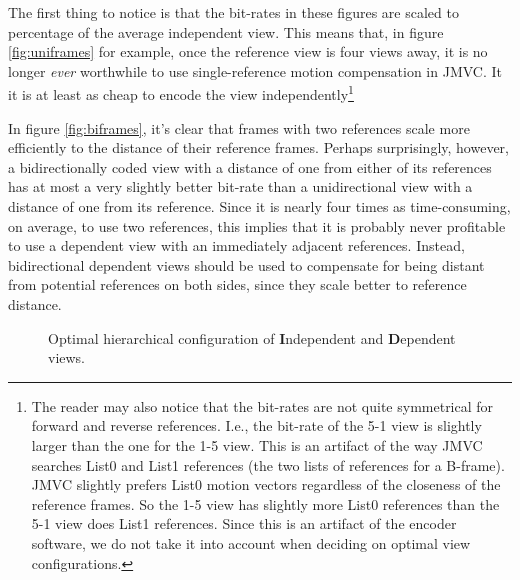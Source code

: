 \documentclass{sig-alternate-05-2015}
\begin{document}
The first thing to notice is that the bit-rates in these figures are scaled to
percentage of the average independent view. This means that, in figure
\ref{fig:uniframes} for example, once the reference view is four views away,
it is no longer {\it ever} worthwhile to use single-reference motion
compensation in JMVC. It it is at least as cheap to encode the view
independently\footnote{The reader may also notice that the bit-rates are not
quite symmetrical for forward and reverse references. I.e., the bit-rate of
the 5-1 view is slightly larger than the one for the 1-5 view. This is an
artifact of the way JMVC searches List0 and List1 references (the two lists
of references for a B-frame). JMVC slightly prefers List0 motion vectors
regardless of the closeness of the reference frames. So the 1-5 view has
slightly more List0 references than the 5-1 view does List1 references. Since
this is an artifact of the encoder software, we do not take it into account when
deciding on optimal view configurations.}

In figure \ref{fig:biframes}, it's clear that frames with two references scale
more efficiently to the distance of their reference frames. Perhaps
surprisingly, however, a bidirectionally coded view with a distance of one from
either of its references has at most a very slightly better bit-rate than a
unidirectional view with a distance of one from its reference. Since it is
nearly four times as time-consuming, on average, to use two references, this
implies that it is probably never profitable to use a dependent view with an
immediately adjacent references. Instead, bidirectional dependent views should
be used to compensate for being distant from potential references on both sides,
since they scale better to reference distance.

\begin{figure}[H]
\begin{center}
\end{center}
\caption{
Optimal hierarchical configuration of \textbf{I}ndependent and
\textbf{D}ependent views.
}
\label{fig:hierarchical}
\end{figure}
\end{document}
